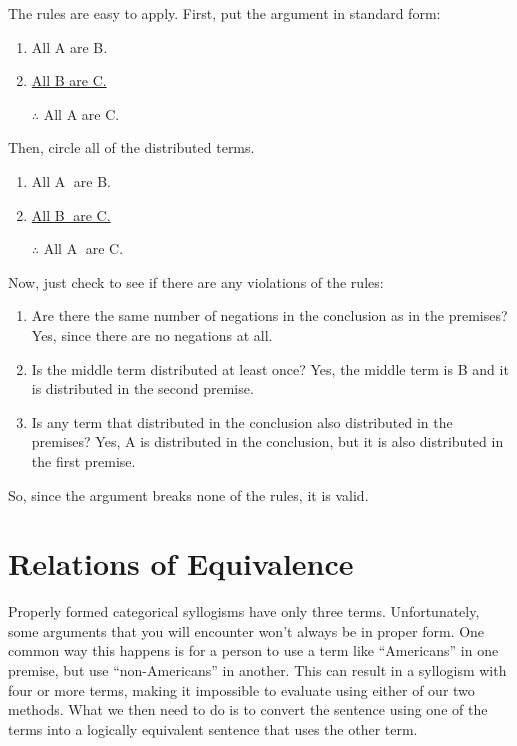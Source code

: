 \documentclass[../logic-text.tex]{subfiles}
\begin{document}
The rules are easy to apply. First, put the argument in standard form:

\begin{enumerate}
\item All A are B.
\item \underline{All B are C.}
\item [$\therefore$] All A are C.
\end{enumerate}

Then, circle all of the distributed terms.

\begin{enumerate}
\item All \textcircled{A} are B.
\item \underline{All \textcircled{B} are C.}
\item [$\therefore$] All \textcircled{A} are C.
\end{enumerate}

Now, just check to see if there are any violations of the rules:

\begin{enumerate}
\item Are there the same number of negations in the conclusion as in the premises? Yes, since there are no negations at all.
\item Is the middle term distributed at least once? Yes, the middle term is B and it is distributed in the second premise.
\item Is any term that distributed in the conclusion also distributed in the premises? Yes, A is distributed in the conclusion, but it is also distributed in the first premise.
\end{enumerate}


So, since the argument breaks none of the rules, it is valid.



\section{Relations of Equivalence}

Properly formed categorical syllogisms have only three terms. Unfortunately, some arguments that you will encounter won't always be in proper form. One common way this happens is for a person to use a term like \enquote{Americans} in one premise, but use \enquote{non-Americans} in another. This can result in a syllogism with four or more terms, making it impossible to evaluate using either of our two methods. What we then need to do is to convert the sentence using one of the terms into a logically equivalent sentence that uses the other term.
\end{document}

